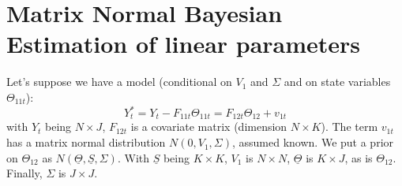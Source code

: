 \documentclass[letter,10pt]{article}
\begin{document}
\section{Matrix Normal Bayesian Estimation of linear parameters}

Let's suppose we have a model (conditional on $V_1$ and $\Sigma$ and on state variables $\Theta_{11t}$):
\[
Y^*_t = Y_t - F_{11t} \Theta_{11t} = F_{12t} \Theta_{12} + v_{1t}
\]
with $Y_t$ being $N \times J$, $F_{12t}$ is a covariate matrix (dimension $N\times K$).  The term $v_{1t}$ has a 
matrix normal distribution $N(0,V_1,\Sigma)$, assumed known.  We put a prior on $\Theta_{12}$ as $N(\underline{\Theta},\underline{S},\Sigma)$.  
With $\underline{S}$ being $K\times K$, $V_1$ is $N\times N$, $\underline{\Theta}$ is $K \times J$, as is $\Theta_{12}$.  Finally, $\Sigma$ is $J \times J$.
\end{document}
